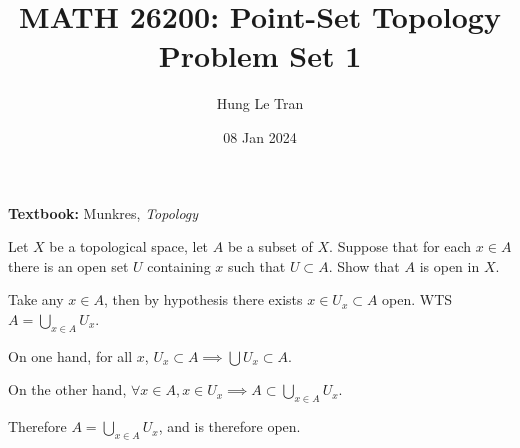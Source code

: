 \documentclass[a4paper, 12pt]{article}
\title{MATH 26200: Point-Set Topology \\ \large Problem Set 1}
\date{08 Jan 2024}
\author{Hung Le Tran}
\begin{document}
\maketitle
\setcounter{section}{1}
\textbf{Textbook:} Munkres, \textit{Topology}
\begin{problem} 
    Let $X$ be a topological space, let $A$ be a subset of $X$. Suppose that for each $x \in A$ there is an open set $U$ containing $x$ such that $U \subset A$. Show that $A$ is open in $X$.
\end{problem}
\begin{solution}
    Take any $x \in A$, then by hypothesis there exists $x \in U_x \subset A$ open. WTS $A = \bigcup_{x \in A} U_x$.

    On one hand, for all $x$, $ U_x \subset A \implies \bigcup U_x \subset A$.

    On the other hand, $\forall x \in A, x \in U_x \implies A \subset \bigcup_{x\in A} U_x$.

    Therefore $A = \bigcup_{x \in A} U_x$, and is therefore open.
\end{solution}
\end{document}
